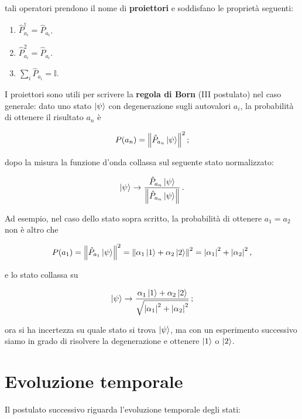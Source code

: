 \noindent tali operatori prendono il nome di \textbf{proiettori} e soddisfano le proprietà seguenti:  
\begin{enumerate}
    \item $\hat P_{a_i}^\dagger = \hat P_{a_i}$.
    \item $\hat P_{a_i}^2 = \hat P_{a_i}$. 
    \item $\sum_i \hat P_{a_i} = \mathbb{I}$. 
\end{enumerate}

\noindent I proiettori sono utili per scrivere la \textbf{regola di Born} (III postulato) nel caso generale: dato uno stato $\ket{\psi}$ con degenerazione sugli autovalori $a_i$, la probabilità di ottenere il risultato $a_n$ è

\begin{equation*}
    P(a_n) = \norm{\hat{P}_{a_n} \ket{\psi}}^2 \, ;
\end{equation*}

\noindent dopo la misura la funzione d'onda collassa sul seguente stato normalizzato:

\begin{equation*}
    \ket{\psi} \rightarrow \frac{\hat{P}_{a_n} \ket{\psi}}{\norm{\hat{P}_{a_n} \ket{\psi}}} \, .
\end{equation*}

\noindent Ad esempio, nel caso dello stato sopra scritto, la probabilità di ottenere $a_1 = a_2$ non è altro che 

\begin{equation*}
    P(a_1) = \norm{\hat{P}_{a_1} \ket{\psi}}^2 = \norm{\alpha_1 \ket{1} + \alpha_2 \ket{2}}^2 = \abs{\alpha_1}^2 + \abs{\alpha_2}^2 \, ,
\end{equation*}

\noindent e lo stato collassa su

\begin{equation*}
    \ket{\psi} \rightarrow \frac{\alpha_1 \ket{1} + \alpha_2 \ket{2}}{\sqrt{\abs{\alpha_1}^2 + \abs{\alpha_2}^2}} \, ;
\end{equation*}

\noindent ora si ha incertezza su quale stato si trova $\ket{\psi}$, ma con un esperimento successivo siamo in grado di risolvere la degenerazione e ottenere $\ket{1}$ o $\ket{2}$. 

\section{Evoluzione temporale}
Il postulato successivo riguarda l'evoluzione temporale degli stati:

